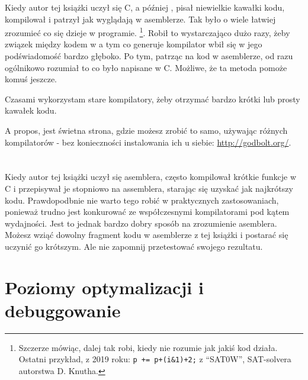
Kiedy autor tej książki uczył się C, a później \Cpp, pisał niewielkie kawałki kodu, kompilował
i patrzył jak wyglądają w asemblerze. Tak było o wiele łatwiej zrozumieć co się dzieje w programie.%
\footnote{Szczerze mówiąc, dalej tak robi, kiedy nie rozumie jak jakiś kod działa.
Ostatni przykład, z 2019 roku: \verb|p += p+(i&1)+2;| z ``SAT0W'', SAT-solvera autorstwa D. Knutha.}.
Robił to wystarczająco dużo razy, żeby związek między kodem w \CCpp a tym co generuje kompilator wbił się w jego podświadomość bardzo głęboko.
Po tym, patrząc na kod w asemblerze, od razu ogólnikowo rozumiał to co było napisane w C.
Możliwe, że ta metoda pomoże komuś jeszcze.


Czasami wykorzystam stare kompilatory, żeby otrzymać bardzo krótki lub prosty kawałek kodu.

A propos, jest świetna strona, gdzie możesz zrobić to samo, używając różnych kompilatorów - bez konieczności instalowania ich u siebie: \url{http://godbolt.org/}.

\section*{\Exercises}

Kiedy autor tej książki uczył się asemblera, często kompilował krótkie funkcje w C i przepisywał
je stopniowo na assemblera, starając się uzyskać jak najkrótszy kodu.
Prawdopodbnie nie warto tego robić w praktycznych zastosowaniach,
ponieważ trudno jest konkurować ze współczesnymi kompilatorami pod kątem wydajności. Jest to jednak bardzo dobry sposób na zrozumienie asemblera.
Możesz wziąć dowolny fragment kodu w asemblerze z tej książki i postarać się uczynić go krótszym.
Ale nie zapomnij przetestować swojego rezultatu.

\section*{Poziomy optymalizacji i debuggowanie}


